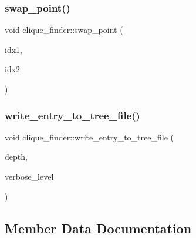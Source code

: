 \mbox{\label{classclique__finder_a633ef9cbc0d127bb38ac2fff74afdf91}} 
\subsubsection{\texorpdfstring{swap\+\_\+point()}{swap\_point()}}
{\footnotesize\ttfamily void clique\+\_\+finder\+::swap\+\_\+point (\begin{DoxyParamCaption}\item[{\mbox{\hyperlink{galois_8h_a09fddde158a3a20bd2dcadb609de11dc}{I\+NT}}}]{idx1,  }\item[{\mbox{\hyperlink{galois_8h_a09fddde158a3a20bd2dcadb609de11dc}{I\+NT}}}]{idx2 }\end{DoxyParamCaption})}

\mbox{\label{classclique__finder_ad903a4dbd2188ead349dafd8fa0ef677}} 
\subsubsection{\texorpdfstring{write\+\_\+entry\+\_\+to\+\_\+tree\+\_\+file()}{write\_entry\_to\_tree\_file()}}
{\footnotesize\ttfamily void clique\+\_\+finder\+::write\+\_\+entry\+\_\+to\+\_\+tree\+\_\+file (\begin{DoxyParamCaption}\item[{\mbox{\hyperlink{galois_8h_a09fddde158a3a20bd2dcadb609de11dc}{I\+NT}}}]{depth,  }\item[{\mbox{\hyperlink{galois_8h_a09fddde158a3a20bd2dcadb609de11dc}{I\+NT}}}]{verbose\+\_\+level }\end{DoxyParamCaption})}



\subsection{Member Data Documentation}
\mbox{\label{classclique__finder_a4bce7963572383e3ddcf1fa6a77bf91c}} 
